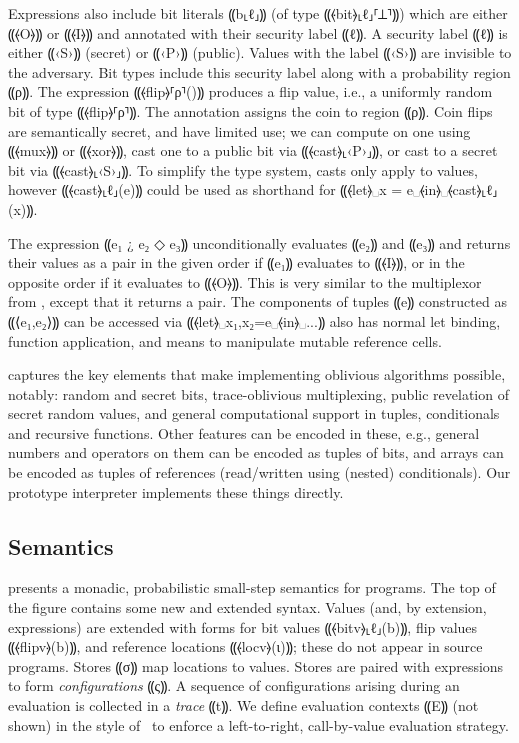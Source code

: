 Expressions also include bit literals ⸨b⸤ℓ⸥⸩ (of type ⸨⦑bit⦒⸤ℓ⸥⸢⊥⸣⸩) which are
either ⸨⦑O⦒⸩ or ⸨⦑I⦒⸩ and annotated with their security label
⸨ℓ⸩.
%
A security label ⸨ℓ⸩ is either
⸨‹S›⸩ (secret) or ⸨‹P›⸩ (public). Values with the label ⸨‹S›⸩ are invisible to
the adversary. Bit types include this security label along with a probability
region ⸨ρ⸩. The expression ⸨⦑flip⦒⸢ρ⸣()⸩ produces a flip value, i.e.,
a uniformly random bit of type ⸨⦑flip⦒⸢ρ⸣⸩.
The annotation assigns the coin to region ⸨ρ⸩. Coin flips are semantically secret, and have
limited use; we can compute on one using ⸨⦑mux⦒⸩ or ⸨⦑xor⦒⸩, cast one to a
public bit via ⸨⦑cast⦒⸤‹P›⸥⸩, or cast to a secret bit via ⸨⦑cast⦒⸤‹S›⸥⸩. To
simplify the type system, casts only apply to values, however ⸨⦑cast⦒⸤ℓ⸥(e)⸩
could be used as shorthand for ⸨⦑let⦒␣x = e␣⦑in⦒␣⦑cast⦒⸤ℓ⸥(x)⸩.

The expression ⸨e₁ {¿} e₂ {◇} e₃⸩ unconditionally evaluates ⸨e₂⸩ and ⸨e₃⸩ and
returns their values as a pair in the given order if ⸨e₁⸩ evaluates to ⸨⦑I⦒⸩, or in the
opposite order if it evaluates to ⸨⦑O⦒⸩. This is very similar to the multiplexor
from \mpc, except that it returns a pair. The components of tuples
⸨e⸩ constructed as ⸨⟨e₁,e₂⟩⸩ can be accessed via ⸨⦑let⦒␣x₁,x₂=e␣⦑in⦒␣...⸩
\obliv also has normal let binding, function application, and means to manipulate
mutable reference cells.

\obliv captures the key elements that make implementing oblivious
algorithms possible, notably: random and secret bits, trace-oblivious
multiplexing, public revelation of secret random values, and general
computational support in tuples, conditionals and recursive functions.
Other features can be encoded in these, e.g., general numbers and
operators on them can be encoded as tuples of bits, and arrays can be
encoded as tuples of references (read/written using (nested) conditionals).
Our prototype interpreter implements these things directly.


\subsection{Semantics}
\label{subsec:obliv-design-sem}

 presents a monadic, probabilistic small-step
semantics for \obliv programs. The top of the figure contains some new and
extended syntax. Values (and, by extension, expressions) are extended with
forms for bit values ⸨⦑bitv⦒⸤ℓ⸥(b)⸩, flip values ⸨⦑flipv⦒(b)⸩, and
reference locations ⸨⦑locv⦒(ι)⸩; these do not appear in source programs. Stores
⸨σ⸩ map locations to values. Stores are paired with expressions to form
\emph{configurations} ⸨ς⸩. A sequence of configurations arising during an
evaluation is collected in a \emph{trace} ⸨t⸩.  We define evaluation
contexts ⸨E⸩ (not shown) in the style of~\citet{felleisen1992revised} to enforce a
left-to-right, call-by-value evaluation strategy.


